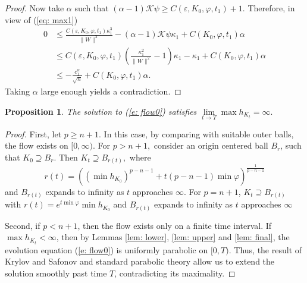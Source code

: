 \documentclass{amsart}
\newtheorem{proposition}[theorem]{Proposition}
\theoremstyle{definition}
\theoremstyle{remark}
\newtheorem{remark}[theorem]{Remark}
\numberwithin{equation}{section}
\begin{document}
\begin{proof}
Now take $\alpha$ such that $(\alpha-1) \mathcal{K}\psi \geq C(\varepsilon,K_0,\varphi,t_1)+1$. Therefore, in view of (\ref{eq: max1})
\begin{equation}\label{x}
\begin{split}
0 &\leq \frac{C(\varepsilon,K_0,\varphi,t_1)\kappa_1^3}{\|W\|^2} - (\alpha-1) \mathcal{K}\psi\kappa_1 + C(K_0,\varphi,t_1)\alpha \\
&\leq C(\varepsilon,K_0,\varphi,t_1)\left(\frac{\kappa_1^2}{\|W\|^2} - 1\right) \kappa_1 - \kappa_1 + C(K_0,\varphi,t_1)\alpha \\
&\leq -\frac{c_1^{\alpha}}{\sqrt{n}} + C(K_0,\varphi,t_1)\alpha.
\end{split}
\end{equation}
Taking $\alpha$ large enough yields a contradiction.
\end{proof}
\begin{proposition}\label{prop: expansion to infty}
The solution to (\ref{e: flow0}) satisfies $\lim\limits_{t\to T}\max h_{K_t}=\infty.$
\end{proposition}
\begin{proof}
First, let $p\geq n+1.$ In this case, by comparing with suitable outer balls, the flow exists on $[0,\infty).$
For $p>n+1,$ consider an origin centered ball $B_r$, such that $K_0\supseteq B_r.$ Then $K_t\supseteq B_{r(t)},$ where $$r(t)=\left((\min h_{K_0})^{p-n-1}+t(p-n-1)\min \varphi \right)^{\frac{1}{p-n-1}}$$ and $B_{r(t)}$ expands to infinity as $t$ approaches $\infty$. For $p=n+1$, $K_t\supseteq B_{r(t)}$ with $r(t)=e^{t\min\varphi}\min h_{K_0}$ and $B_{r(t)}$ expands to infinity as $t$ approaches $\infty$

Second, if $p<n+1$, then the flow exists only on a finite time interval. If $\max h_{K_t}<\infty$, then by Lemmas \ref{lem: lower}, \ref{lem: upper} and \ref{lem: final}, the evolution equation (\ref{e: flow0}) is uniformly parabolic on $[0,T)$. Thus, the result of Krylov and Safonov \cite{Krylov-Safonov} and standard parabolic theory allow us to extend the solution smoothly past time $T$, contradicting its maximality.
\end{proof}
\end{document}
